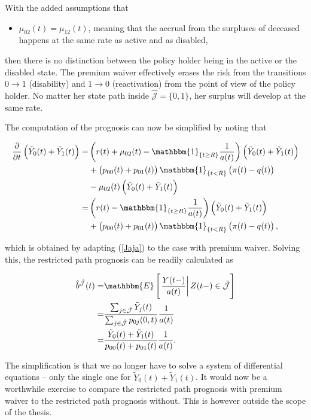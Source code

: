 \documentclass{article}
\newcommand{\1}[1]{\mathbbm{1}_{\left\lbrace #1 \right\rbrace}}
\newcommand{\econd}[2][def]{\mathbbm{E} \left[ \left. #1 \right| #2 \right]}
\theoremstyle{break}
\theoremstyle{remark}
\numberwithin{equation}{section}
\begin{document}
With the added assumptions that

\begin{itemize}
	\item $\mu_{02}(t) = \mu_{12}(t)$, meaning that the accrual from the surpluses of deceased happens at the same rate as active and as disabled,
\end{itemize}

then there is no distinction between the policy holder being in the active or the disabled state. The premium waiver effectively erases the risk from the transitions $0 \to 1$ (disability) and $1 \to 0$ (reactivation) from the point of view of the policy holder. No matter her state path inside $\hat{\mathcal{J}} = \{ 0,1 \}$, her surplus will develop at the same rate.

The computation of the prognosis can now be simplified by noting that

\begin{align*}
	\frac{\partial}{\partial t} \left(\tilde{Y}_0(t) + \tilde{Y}_1(t)\right) =& \left( r(t) + \mu_{02}(t) - \1{t \geq R} \frac{1}{a(t)}\right) \left(\tilde{Y}_0(t) + \tilde{Y}_1(t)\right) \\
	&+ \left(p_{00}(t) + p_{01}(t)\right)\1{t<R}\left(\pi(t) - q(t)\right) \\
	&- \mu_{02}(t) \left(\tilde{Y}_0(t) + \tilde{Y}_1(t)\right) \\
	=& \left( r(t) - \1{t \geq R} \frac{1}{a(t)}\right) \left(\tilde{Y}_0(t) + \tilde{Y}_1(t)\right) \\
	&+ \left(p_{00}(t) + p_{01}(t)\right)\1{t<R}\left(\pi(t) - q(t)\right),
\end{align*}

which is obtained by adapting (\ref{Jaja}) to the case with premium waiver. Solving this, the restricted path prognosis can be readily calculated as

\begin{align*}
	\hat{b}^{\hat{\mathcal{J}}}(t) =& \econd[\frac{Y(t-)}{a(t)}]{Z(t-) \in \bar{\mathcal{J}}} \\
	=&\frac{\sum_{j \in \hat{\mathcal{J}}} \tilde{Y}_j(t)}{\sum_{j \in \hat{\mathcal{J}}} p_{0j}(0,t)} \frac{1}{a(t)} \\
	=&\frac{\tilde{Y}_0(t) + \tilde{Y}_1(t)}{p_{00}(t) + p_{01}(t)} \frac{1}{a(t)}.
\end{align*}

The simplification is that we no longer have to solve a system of differential equations -- only the single one for $\tilde{Y}_0(t) + \tilde{Y}_1(t)$. It would now be a worthwhile exercise to compare the restricted path prognosis with premium waiver to the restricted path prognosis without. This is however outside the scope of the thesis. 
\end{document}
